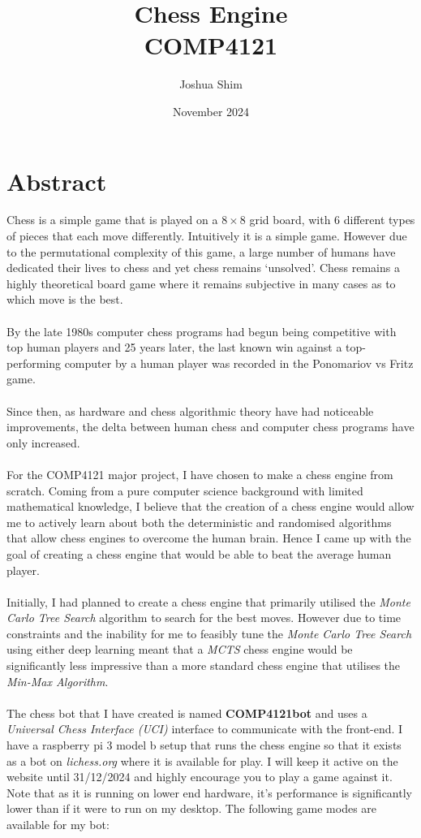 \documentclass[a4paper,12pt]{report}
\title{Chess Engine\\
{\Large COMP4121}}
\author{Joshua Shim}
\date{November 2024}
\begin{document}
\maketitle
\chapter*{Abstract}

Chess is a simple game that is played on a $8 \times 8$ grid board, with 6 different types of pieces that each move differently. Intuitively it is a simple game. However due to the permutational complexity of this game, a large number of humans have dedicated their lives to chess and yet chess remains `unsolved'. Chess remains a highly theoretical board game where it remains subjective in many cases as to which move is the best.
\\\\
By the late 1980s computer chess programs had begun being competitive with top human players and 25 years later, the last known win against a top-performing computer by a human player was recorded in the Ponomariov vs Fritz game.
\\\\
Since then, as hardware and chess algorithmic theory have had noticeable improvements, the delta between human chess and computer chess programs have only increased.
\\\\
For the COMP4121 major project, I have chosen to make a chess engine from scratch. Coming from a pure computer science background with limited mathematical knowledge, I believe that the creation of a chess engine would allow me to actively learn about both the deterministic and randomised algorithms that allow chess engines to overcome the human brain. Hence I came up with the goal of creating a chess engine that would be able to beat the average human player.
\\\\
Initially, I had planned to create a chess engine that primarily utilised the \textit{Monte Carlo Tree Search} algorithm to search for the best moves. However due to time constraints and the inability for me to feasibly tune the \textit{Monte Carlo Tree Search} using either deep learning meant that a \textit{MCTS} chess engine would be significantly less impressive than a more standard chess engine that utilises the \textit{Min-Max Algorithm}.
\\\\
The chess bot that I have created is named \textbf{COMP4121bot} and uses a \textit{Universal Chess Interface (UCI)} interface to communicate with the front-end. I have a raspberry pi 3 model b setup that runs the chess engine so that it exists as a bot on \textit{lichess.org} where it is available for play. I will keep it active on the website until 31/12/2024 and highly encourage you to play a game against it. Note that as it is running on lower end hardware, it's performance is significantly lower than if it were to run on my desktop. The following game modes are available for my bot:

\tableofcontents







\end{document}

